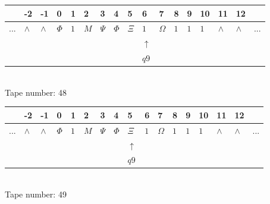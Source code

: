 \documentclass[11pt]{article}
\begin{document}
\begin{table}[H]
\centering
\begin{tabular}{lllllllllllllllll}
 & -2 & -1 & 0 & 1 & 2 & 3 & 4 & 5 & 6 & 7 & 8 & 9 & 10 & 11 & 12 & \\
\hline
$...$ & \multicolumn{1}{|l|}{$\wedge$} & \multicolumn{1}{|l|}{$\wedge$} & \multicolumn{1}{|l|}{$\Phi$} & \multicolumn{1}{|l|}{$1$} & \multicolumn{1}{|l|}{$M$} & \multicolumn{1}{|l|}{$\Psi$} & \multicolumn{1}{|l|}{$\Phi$} & \multicolumn{1}{|l|}{$\Xi$} & \multicolumn{1}{|l|}{$1$} & \multicolumn{1}{|l|}{$\Omega$} & \multicolumn{1}{|l|}{$1$} & \multicolumn{1}{|l|}{$1$} & \multicolumn{1}{|l|}{$1$} & \multicolumn{1}{|l|}{$\wedge$} & \multicolumn{1}{|l|}{$\wedge$} & $...$\\
\hline
&  &  &  &  &  &  &  &  & $\uparrow$ &  &  &  &  &  &  &  \\
&  &  &  &  &  &  &  &  & $ q9 $ &  &  &  &  &  &  &  \\
\end{tabular}
\\
Tape number: 48
\noindent\makebox[\linewidth]{\hdashrule{\textwidth}{1pt}{1pt}}\end{table}

\begin{table}[H]
\centering
\begin{tabular}{lllllllllllllllll}
 & -2 & -1 & 0 & 1 & 2 & 3 & 4 & 5 & 6 & 7 & 8 & 9 & 10 & 11 & 12 & \\
\hline
$...$ & \multicolumn{1}{|l|}{$\wedge$} & \multicolumn{1}{|l|}{$\wedge$} & \multicolumn{1}{|l|}{$\Phi$} & \multicolumn{1}{|l|}{$1$} & \multicolumn{1}{|l|}{$M$} & \multicolumn{1}{|l|}{$\Psi$} & \multicolumn{1}{|l|}{$\Phi$} & \multicolumn{1}{|l|}{$\Xi$} & \multicolumn{1}{|l|}{$1$} & \multicolumn{1}{|l|}{$\Omega$} & \multicolumn{1}{|l|}{$1$} & \multicolumn{1}{|l|}{$1$} & \multicolumn{1}{|l|}{$1$} & \multicolumn{1}{|l|}{$\wedge$} & \multicolumn{1}{|l|}{$\wedge$} & $...$\\
\hline
&  &  &  &  &  &  &  & $\uparrow$ &  &  &  &  &  &  &  &  \\
&  &  &  &  &  &  &  & $ q9 $ &  &  &  &  &  &  &  &  \\
\end{tabular}
\\
Tape number: 49
\noindent\makebox[\linewidth]{\hdashrule{\textwidth}{1pt}{1pt}}\end{table}
\end{document}
